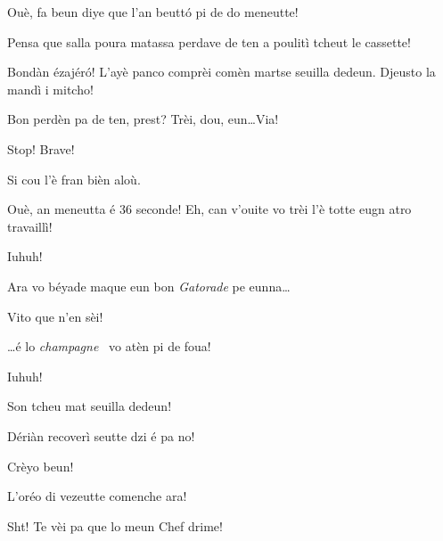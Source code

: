 \begin{drama}
\FennepulisieBspeaks Ouè, fa beun diye que l’an beutt\'o pi de do meneutte!

\FennepulisieCspeaks Pensa que salla poura matassa perdave de ten a poulitì tcheut le cassette!

\FennepulisieAspeaks Bondàn ézajér\'o! L’ayè panco comprèi comèn martse seuilla dedeun. Djeusto la mandì i mitcho!

\Starterspeaks Bon perdèn pa de ten, prest? Trèi, dou, eun\ldots Via!




\Starterspeaks Stop! Brave!

\FennepulisieBspeaks Si cou l’è fran bièn aloù.

\Starterspeaks Ouè, an meneutta é 36 seconde! Eh, can v'ouite vo trèi l’è totte eugn atro travaillì! 

\Fennepulisiespeaks Iuhuh!

\Starterspeaks Ara vo béyade maque eun bon \textit{Gatorade} pe eunna\ldots

\FennepulisieCspeaks Vito que n'en sèi!


\Starterspeaks \ldots é lo \textit{champagne} \champagne\ vo atèn pi de foua!

\Fennepulisiespeaks Iuhuh!


\Gerominespeaks Son tcheu mat seuilla dedeun!

\Casimirspeaks Dériàn recoverì seutte dzi é pa no!

\Gerominespeaks Crèyo beun!



\Eunfeurmiespeaks {} L'oréo di vezeutte comenche ara!

\Eunfeurmispeaks Sht! Te vèi pa que lo meun Chef drime!


\end{drama}
